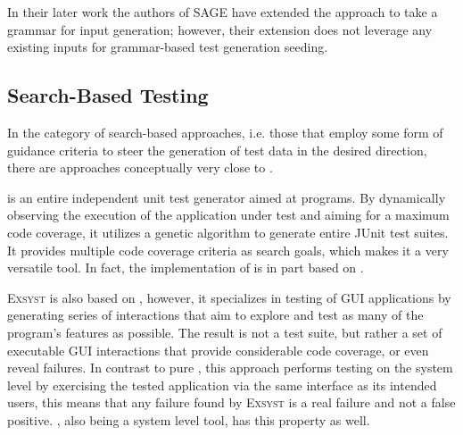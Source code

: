 In their later work \cite{Godefroid:2008:GWF:1375581.1375607} the authors of SAGE have extended the approach to
take a grammar for input generation; however, their extension does not leverage any existing inputs for
grammar-based test generation seeding.

\subsection{Search-Based Testing}
In the category of search-based approaches, i.e. those that employ some form of guidance criteria to steer the
generation of test data in the desired direction, there are approaches conceptually very close to \xmlmate.

\evosuite{}\cite{fraser2013whole} is an entire independent unit test generator aimed at \java programs. By
dynamically observing the execution of the application under test and aiming for a maximum code coverage, it
utilizes a genetic algorithm to generate entire JUnit test suites. It provides multiple code coverage
criteria as search goals, which makes it a very versatile tool. In fact, the implementation of \xmlmate is
in part based on \evosuite.

\textsc{Exsyst}\cite{gross-issta2012} is also based on \evosuite, however, it specializes in testing of \java
GUI applications by generating series of interactions that aim to explore and test as many of the program's
features as possible. The result is not a test suite, but rather a set of executable GUI interactions that
provide considerable code coverage, or even reveal failures. In contrast to pure \evosuite, this approach
performs testing on the system level by exercising the tested application via the same interface as its
intended users, this means that any failure found by \textsc{Exsyst} is a real failure and not a false
positive. \xmlmate, also being a system level tool, has this property as well.
